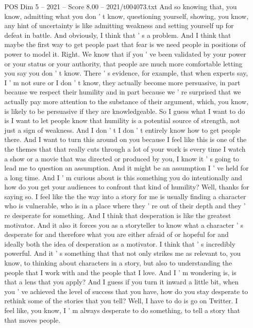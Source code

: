 \begin{textsample}{POS Dim 5 – 2021 – Score 8.00 – 2021/t004073.txt}
And so knowing that, you know, admitting what you don ' t know, questioning yourself, showing, you know, any hint of uncertainty is like admitting weakness and setting yourself up for defeat in battle.
And obviously, I think that ' s a problem.
And I think that maybe the first way to get people past that fear is we need people in positions of power to model it.
Right.
We know that if you ' ve been validated by your power or your status or your authority, that people are much more comfortable letting you say you don ' t know.
There ' s evidence, for example, that when experts say, I ' m not sure or I don ' t know, they actually become more persuasive, in part because we respect their humility and in part because we ' re surprised that we actually pay more attention to the substance of their argument, which, you know, is likely to be persuasive if they are knowledgeable.
So I guess what I want to do is I want to let people know that humility is a potential source of strength, not just a sign of weakness.
And I don ' t I don ' t entirely know how to get people there.
And I want to turn this around on you because I feel like this is one of the the themes that that really cuts through a lot of your work is every time I watch a show or a movie that was directed or produced by you, I know it ' s going to lead me to question an assumption.
And it might be an assumption I ' ve held for a long time.
And I ' m curious about is this something you do intentionally and how do you get your audiences to confront that kind of humility?
Well, thanks for saying so.
I feel like the the way into a story for me is usually finding a character who is vulnerable, who is in a place where they ' re out of their depth and they ' re desperate for something.
And I think that desperation is like the greatest motivator.
And it also it forces you as a storyteller to know what a character ' s desperate for and therefore what you are either afraid of or hopeful for and ideally both the idea of desperation as a motivator.
I think that ' s incredibly powerful.
And it ' s something that that not only strikes me as relevant to, you know, to thinking about characters in a story, but also to understanding the people that I work with and the people that I love.
And I ' m wondering is, is that a lens that you apply?
And I guess if you turn it inward a little bit, when you ' ve achieved the level of success that you have, how do you stay desperate to rethink some of the stories that you tell?
Well, I have to do is go on Twitter.
I feel like, you know, I ' m always desperate to do something, to tell a story that that moves people.

\end{textsample}
